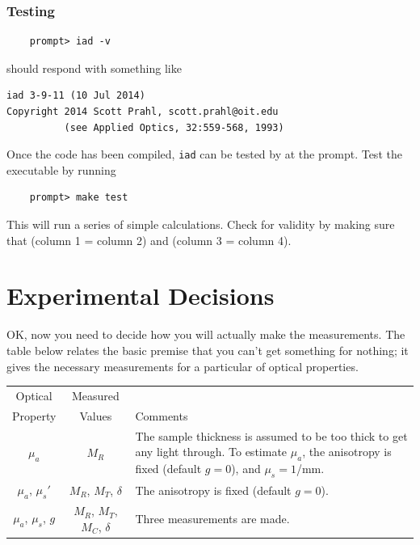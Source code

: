 \documentclass{article}
\newcommand\iadprog{\texttt{iad}}
\begin{document}
\subsubsection{Testing}
\begin{verbatim}
    prompt> iad -v
\end{verbatim}
should respond with something like
\begin{verbatim}
iad 3-9-11 (10 Jul 2014)
Copyright 2014 Scott Prahl, scott.prahl@oit.edu
          (see Applied Optics, 32:559-568, 1993)
\end{verbatim}

Once the code has been compiled, \iadprog{} can be tested by
at the prompt.  Test the executable by running
\begin{verbatim}
    prompt> make test
\end{verbatim}
This will run a series of simple calculations.  Check for validity by making sure
that (column 1 = column 2) and (column 3 = column 4).

\clearpage

\section{Experimental Decisions}

OK, now you need to decide how you will actually make the measurements. The table
below relates the basic premise that you can't get something for nothing; it gives
the necessary measurements for a particular of optical properties.

\begin{table}[h!]
\begin{center}
\begin{tabular}{c|c|p{7cm}}
 Optical               & Measured                      & \\
 Property              & Values                        & Comments\\
\hline
 $\mu_a$               & $M_R$                         & The sample thickness is assumed to be too thick to get any light through.  To estimate $\mu_a$, the anisotropy is fixed (default $g=0$), and $\mu_s=1$/mm.\\
 $\mu_a$, $\mu_s'$     & $M_R$, $M_T$, $\delta$        & The anisotropy is fixed (default $g=0$).\\
 $\mu_a$, $\mu_s$, $g$ & $M_R$, $M_T$, $M_C$, $\delta$ & Three measurements are made.\\
\end{tabular}
\end{center}
\end{table}
\end{document}
